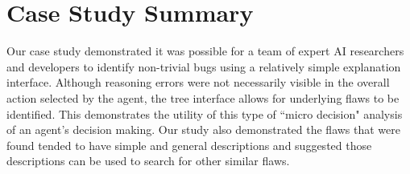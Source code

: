 \documentclass{article}
\begin{document}



\section{Case Study Summary}  

Our case study demonstrated it was possible for a team of expert AI researchers and developers to identify non-trivial bugs using a relatively simple explanation interface. Although reasoning errors were not necessarily visible in the overall action selected by the agent, the tree interface allows for underlying flaws to be identified. This demonstrates the utility of this type of ``micro decision" analysis of an agent's decision making. Our study also demonstrated the flaws that were found tended to have simple and general descriptions and suggested those descriptions can be used to search for other similar flaws. %

\end{document}
